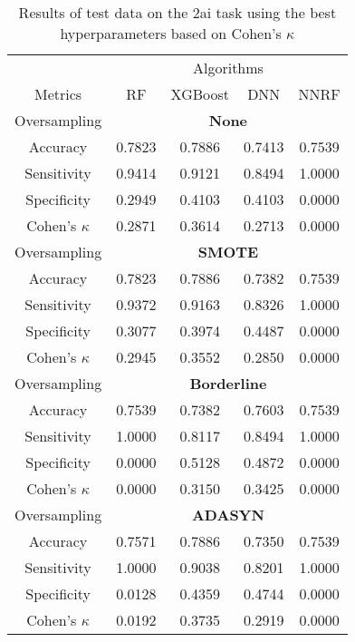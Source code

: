 \begin{table}[!htb]
\centering
\caption{Results of test data on the 2ai task using the best hyperparameters based on Cohen's $\kappa$}
\label{tab:2ai_test_results}
\begin{tabular}{c | c c c c}
\hline
    & \multicolumn{4}{c}{Algorithms}\\ 
Metrics &RF & XGBoost & DNN & NNRF\\ 
\hline
Oversampling &\multicolumn{4}{|c}{\textbf{None}}\\ 
\hline
Accuracy & 0.7823 & 0.7886 & 0.7413 & 0.7539\\ 
Sensitivity & 0.9414 & 0.9121 & 0.8494 & 1.0000\\ 
Specificity & 0.2949 & 0.4103 & 0.4103 & 0.0000\\ 
Cohen's $\kappa$ & 0.2871 & 0.3614 & 0.2713 & 0.0000\\ 
\hline
Oversampling &\multicolumn{4}{|c}{\textbf{SMOTE}}\\ 
\hline
Accuracy & 0.7823 & 0.7886 & 0.7382 & 0.7539\\ 
Sensitivity & 0.9372 & 0.9163 & 0.8326 & 1.0000\\ 
Specificity & 0.3077 & 0.3974 & 0.4487 & 0.0000\\ 
Cohen's $\kappa$ & 0.2945 & 0.3552 & 0.2850 & 0.0000\\ 
\hline
Oversampling &\multicolumn{4}{|c}{\textbf{Borderline}}\\ 
\hline
Accuracy & 0.7539 & 0.7382 & 0.7603 & 0.7539\\ 
Sensitivity & 1.0000 & 0.8117 & 0.8494 & 1.0000\\ 
Specificity & 0.0000 & 0.5128 & 0.4872 & 0.0000\\ 
Cohen's $\kappa$ & 0.0000 & 0.3150 & 0.3425 & 0.0000\\ 
\hline
Oversampling &\multicolumn{4}{|c}{\textbf{ADASYN}}\\ 
\hline
Accuracy & 0.7571 & 0.7886 & 0.7350 & 0.7539\\ 
Sensitivity & 1.0000 & 0.9038 & 0.8201 & 1.0000\\ 
Specificity & 0.0128 & 0.4359 & 0.4744 & 0.0000\\ 
Cohen's $\kappa$ & 0.0192 & 0.3735 & 0.2919 & 0.0000\\ 
\hline
\end{tabular}
\end{table}
